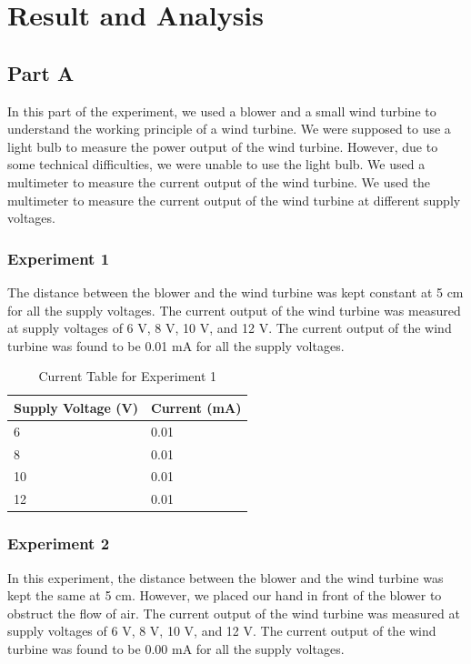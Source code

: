 \documentclass[a4paper, 12pt, english]{article}
\begin{document}
\section{Result and Analysis}
\subsection{Part A}
In this part of the experiment, we used a blower and a small wind turbine to
understand the working principle of a wind turbine. We were supposed to use a
light bulb to measure the power output of the wind turbine. However, due to
some technical difficulties, we were unable to use the light bulb. We used a
multimeter to measure the current output of the wind turbine. We used the
multimeter to measure the current output of the wind turbine at different
supply voltages.

\subsubsection{Experiment 1}
The distance between the blower and the wind turbine was kept constant at 5 cm
for all the supply voltages. The current output of the wind turbine was
measured at supply voltages of 6 V, 8 V, 10 V, and 12 V. The current output of
the wind turbine was found to be 0.01 mA for all the supply voltages.

\begin{table}[H]
	\centering
	\caption{Current Table for Experiment 1}
	\label{tab:table1}
	\begin{tabular}{@{}ll@{}}
		\toprule
		\textbf{Supply Voltage (V)} & \textbf{Current (mA)} \\ \midrule
		6                           & 0.01                  \\
		8                           & 0.01                  \\
		10                          & 0.01                  \\
		12                          & 0.01                  \\ \bottomrule
	\end{tabular}
\end{table}

\subsubsection{Experiment 2}
In this experiment, the distance between the blower and the wind turbine was
kept the same at 5 cm. However, we placed our hand in front of the blower to
obstruct the flow of air. The current output of the wind turbine was measured
at supply voltages of 6 V, 8 V, 10 V, and 12 V. The current output of the wind
turbine was found to be 0.00 mA for all the supply voltages.
\end{document}
